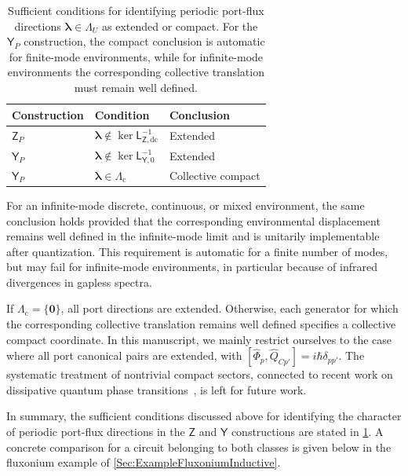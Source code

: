 \documentclass[prx,aps,twocolumn,article]{revtex4-2}
\newcommand{\msf}[1]{\mathsf{#1}}
\newcommand{\bsb}[1]{\boldsymbol{#1}}
\newcommand{\msY}{\msf{Y}}
\newcommand{\msZ}{\msf{Z}}
\newcommand{\msL}{\msf{L}}
\begin{document}
\begin{table}[t]
    \centering
    \small
    \caption{Sufficient conditions for identifying periodic port-flux
    directions $\boldsymbol{\lambda}\in\Lambda_U$ as extended or compact.
    For the $\msY_P$ construction, the compact conclusion is automatic for
    finite-mode environments, while for infinite-mode environments the
    corresponding collective translation must remain well defined.}
    \label{tab:ImmittanceCompactness}
    \begin{tabular}{@{}lll@{}}
        \hline
        Construction & Condition & Conclusion \\
        \hline
        $\msZ_P$
        &
        $\displaystyle
        \boldsymbol{\lambda}\notin
        \ker\msL_{\msZ,\mathrm{dc}}^{-1}$
        &
        Extended
        \\[2mm]
        $\msY_P$
        &
        $\displaystyle
        \boldsymbol{\lambda}\notin
        \ker\msL_{\msY,0}^{-1}$
        &
        Extended
        \\[2mm]
        $\msY_P$
        &
        $\displaystyle
        \boldsymbol{\lambda}\in\Lambda_{\mathrm c}$
        &
        Collective compact
        \\
        \hline
    \end{tabular}
\end{table}
For an infinite-mode discrete, continuous, or mixed environment, the same
conclusion holds provided that the corresponding environmental displacement
remains well defined in the infinite-mode limit and is unitarily
implementable after quantization. This requirement is automatic for a finite
number of modes, but may fail for infinite-mode environments, in particular
because of infrared divergences in gapless spectra.

If $\Lambda_{\mathrm c}=\{\bsb{0}\}$, all port directions are extended. Otherwise, each generator for which the corresponding collective translation remains well defined specifies a collective compact coordinate. In this manuscript, we mainly restrict ourselves to the case where all port canonical
pairs are extended, with $\left[\hat{\Phi}_p,\hat{Q}_{Cp'}\right]
=i\hbar\delta_{pp'}$. The systematic treatment of nontrivial compact sectors, connected to recent work on dissipative quantum phase transitions~\cite{Kuzmin:2019,Kuzmin:2021,Hakonen:2021,Mehta:2022,
Giacomelli:2024,Kuzmin:2025,Paris:2025,Giacomelli:2026}, is left for future
work.    

In summary, the sufficient conditions discussed above for identifying the character of periodic port-flux directions in the $\msZ$ and $\msY$ constructions are stated in \cref{tab:ImmittanceCompactness}. A concrete comparison for a circuit belonging to both classes is given below in the fluxonium example of \cref{Sec:ExampleFluxoniumInductive}.
\end{document}
